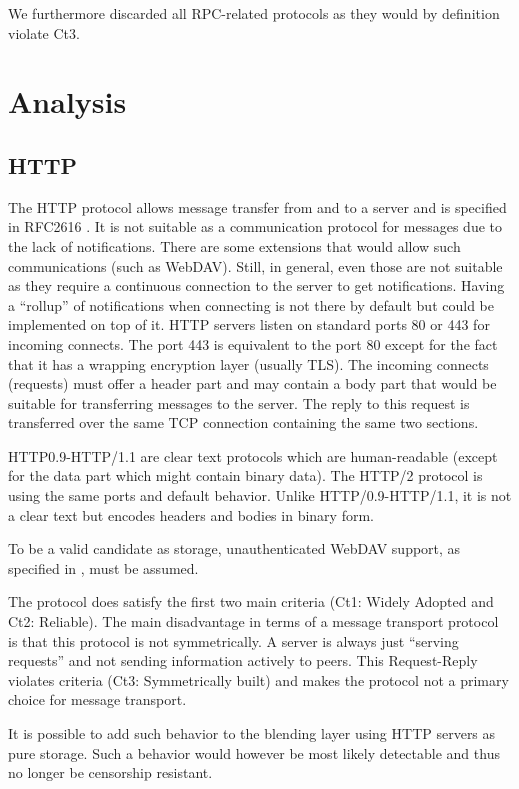\documentclass[a4paper,appendixprefix,pdfusetitle,twocolumn,fontsize=8pt,DIV=calc,8pt,draft]{\doctype} %
\begin{document}
We furthermore discarded all RPC-related protocols as they would by definition violate Ct3.

\section{Analysis}
\subsection{HTTP}
The HTTP protocol allows message transfer from and to a server and is specified in RFC2616 \cite{rfc2616}. It is not suitable as a communication protocol for messages due to the lack of notifications. There are some extensions that would allow such communications (such as WebDAV). Still, in general, even those are not suitable as they require a continuous connection to the server to get notifications. Having a ``rollup'' of notifications when connecting is not there by default but could be implemented on top of it. HTTP servers listen on standard ports 80 or 443 for incoming connects. The port 443 is equivalent to the port 80 except for the fact that it has a wrapping encryption layer (usually TLS). The incoming connects (requests) must offer a header part and may contain a body part that would be suitable for transferring messages to the server. The reply to this request is transferred over the same TCP connection containing the same two sections.

HTTP0.9-HTTP/1.1 are clear text protocols which are human-readable (except for the data part which might contain binary data). The HTTP/2\cite{rfc7540} protocol is using the same ports and default behavior. Unlike HTTP/0.9-HTTP/1.1, it is not a clear text but encodes headers and bodies in binary form. 

To be a valid candidate as storage, unauthenticated WebDAV support, as specified in \cite{rfc4918}, must be assumed.

The protocol does satisfy the first two main criteria (Ct1: Widely Adopted and Ct2: Reliable). The main disadvantage in terms of a message transport protocol is that this protocol is not symmetrically. A server is always just ``serving requests'' and not sending information actively to peers. This Request-Reply violates criteria (Ct3: Symmetrically built) and makes the protocol not a primary choice for message transport. 

It is possible to add such behavior to the blending layer using HTTP servers as pure storage. Such a behavior would however be most likely detectable and thus no longer be censorship resistant.
\end{document}
